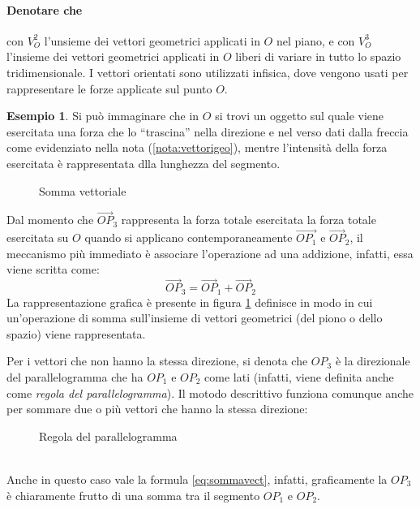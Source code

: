 \documentclass{book}
\theoremstyle{definition}
\newtheorem{es}{Esempio}[section]
\theoremstyle{plain}
\begin{document}
\paragraph{Denotare che}
con $V_O^2$ l'unsieme dei vettori geometrici applicati in $O$ nel piano, e con $V_O^3$ l'insieme dei vettori geometrici applicati in $O$ liberi di variare in tutto lo spazio tridimensionale. I vettori orientati sono utilizzati infisica, dove vengono usati per rappresentare le forze applicate sul punto $O$.
\begin{es}
  Si può immaginare che in $O$ si trovi un oggetto sul quale viene esercitata una forza che lo ``trascina'' nella direzione e nel verso dati dalla freccia come evidenziato nella nota (\ref{nota:vettorigeo}), mentre l'intensità della forza esercitata è rappresentata dlla lunghezza del segmento.
\begin{figure}[ht!]
  \centering
  \resizebox{7.5cm}{!}{
      
    }
  \caption{Somma vettoriale}
  \label{fig:sommavect}
\end{figure}
Dal momento che $\vec{OP}_3$ rappresenta la forza totale esercitata la forza totale esercitata su $O$ quando si applicano contemporaneamente $\vec{OP_1}$ e $\vec{OP}_2$, il meccanismo più immediato è associare l'operazione ad una addizione, infatti, essa viene scritta come:
\begin{equation}
  \label{eq:sommavect}
  \vec{OP}_3=\vec{OP}_1+\vec{OP}_2
\end{equation}
La rappresentazione grafica è presente in figura \ref{fig:sommavect} definisce in modo in cui un'operazione di somma sull'insieme di vettori geometrici (del piono o dello spazio) viene rappresentata.
\end{es}
Per i vettori che non hanno la stessa direzione, si denota che $OP_3$ è la direzionale del parallelogramma che ha $OP_1$ e $OP_2$ come lati (infatti, viene definita anche come \textit{regola del parallelogramma}). Il motodo descrittivo funziona comunque anche per sommare due o più vettori che hanno la stessa direzione:
\begin{figure}[ht!]
  \centering
  \resizebox{9cm}{!}{
      
    }
  \caption{Regola del parallelogramma}
  \label{fig:metparallelogramma}
\end{figure}\\
Anche in questo caso vale la formula \ref{eq:sommavect}, infatti, graficamente la $OP_3$ è chiaramente frutto di una somma tra il segmento $OP_1$ e $OP_2$.
\end{document}
